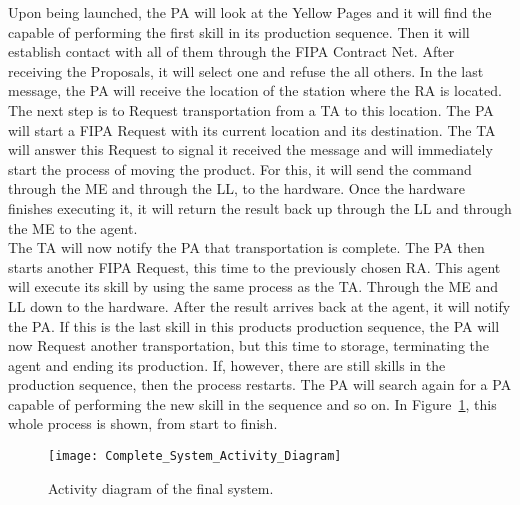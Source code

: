 Upon being launched, the \acrshort{PA} will look at the Yellow Pages and it will find the  capable of performing the first skill in its production sequence. Then it will establish contact with all of them through the \acrshort{FIPA} Contract Net. After receiving the Proposals, it will select one and refuse the all others. In the last message, the \acrshort{PA} will receive the location of the station where the \acrshort{RA} is located.\\

The next step is to Request transportation from a \acrshort{TA} to this location. The \acrshort{PA} will start a \acrshort{FIPA} Request with its current location and its destination. The \acrshort{TA} will answer this Request to signal it received the message and will immediately start the process of moving the product. For this, it will send the command through the \acrlong{ME} and through the \acrlong{LL}, to the hardware. Once the hardware finishes executing it, it will return the result back up through the \acrshort{LL} and through the \acrshort{ME} to the agent.\\

The \acrshort{TA} will now notify the \acrshort{PA} that transportation is complete. The \acrshort{PA} then starts another \acrshort{FIPA} Request, this time to the previously chosen \acrshort{RA}. This agent will execute its skill by using the same process as the \acrshort{TA}. Through the \acrshort{ME} and \acrshort{LL} down to the hardware. After the result arrives back at the agent, it will notify the \acrshort{PA}. If this is the last skill in this products production sequence, the \acrshort{PA} will now Request another transportation, but this time to storage, terminating the agent and ending its production. If, however, there are still skills in the production sequence, then the process restarts. The \acrshort{PA} will search again for a \acrshort{PA} capable of performing the new skill in the sequence and so on. In Figure~\ref{fig:complete_activity_diagram}, this whole process is shown, from start to finish.\\

\begin{figure}[h!]
	\centering
	\texttt{[image: Complete\_System\_Activity\_Diagram]}
	\caption{Activity diagram of the final system.}
	\label{fig:complete_activity_diagram}
\end{figure}
